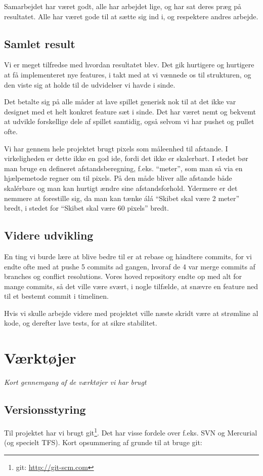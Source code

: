 \documentclass[titlepage,danish]{article}
\begin{document}
Samarbejdet har været godt, alle har arbejdet lige, og har sat deres præg på resultatet. Alle har været
gode til at sætte sig ind i, og respektere andres arbejde.

\subsection{Samlet result}
Vi er meget tilfredse med hvordan resultatet blev. Det gik hurtigere og hurtigere at få
implementeret nye features, i takt med at vi vænnede os til strukturen, og den viste sig at holde
til de udvidelser vi havde i sinde.

Det betalte sig på alle måder at lave spillet generisk nok til at det ikke var designet med et helt
konkret feature sæt i sinde. Det har været nemt og bekvemt at udvikle forskellige dele af spillet
samtidig, også selvom vi har pushet og pullet ofte. 

Vi har gennem hele projektet brugt pixels som måleenhed til afstande. I virkeligheden er dette ikke
en god ide, fordi det ikke er skalerbart. I stedet bør man bruge en defineret afstandsberegning,
f.eks. ``meter'', som man så via en hjælpemetode regner om til pixels. På den måde bliver alle
afstande både skalérbare og man kan hurtigt ændre sine afstandsforhold. Ydermere er det nemmere at
forestille sig, da man kan tænke álá ``Skibet skal være 2 meter'' bredt, i stedet for ``Skibet skal
være 60 pixels'' bredt.

\subsection{Videre udvikling}
En ting vi burde lære at blive bedre til er at rebase og håndtere commits, for vi endte ofte med
at pushe 5 commits ad gangen, hvoraf de 4 var merge commits af branches og conflict
resolutions. Vores hoved repository endte op med alt for mange commits, så det ville være svært, i
nogle tilfælde, at snævre en feature ned til et bestemt commit i timelinen.

Hvis vi skulle arbejde videre med projektet ville næste skridt være at strømline al kode, og
derefter lave tests, for at sikre stabilitet.

\section{Værktøjer}
\emph{Kort gennemgang af de værktøjer vi har brugt}
\subsection{Versionsstyring}
Til projektet har vi brugt git\footnote{git: \url{http://git-scm.com}}. Det har visse fordele over
f.eks. SVN og Mercurial (og specielt TFS). Kort opsummering af grunde til at bruge git:
\end{document}
